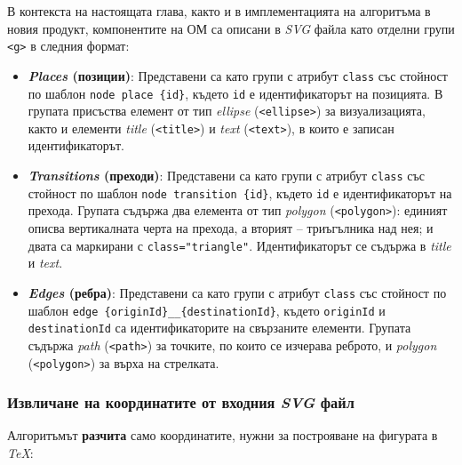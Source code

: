 В контекста на настоящата глава, както и в имплементацията на алгоритъма в новия продукт, компонентите на ОМ са описани в \textit{SVG} файла като отделни групи \texttt{<g>} в следния формат:

\begin{itemize}
	\item \textbf{\textit{Places} (позиции)}: Представени са като групи с атрибут \texttt{class} със стойност по шаблон \texttt{node place \{id\}}, където \texttt{id} е идентификаторът на позицията. В групата присъства елемент от тип \textit{ellipse} (\texttt{<ellipse>}) за визуализацията, както и елементи \textit{title} (\texttt{<title>}) и \textit{text} (\texttt{<text>}), в които е записан идентификаторът.
	
	\item \textbf{\textit{Transitions} (преходи)}: Представени са като групи с атрибут \texttt{class} със стойност по шаблон \texttt{node transition \{id\}}, където \texttt{id} е идентификаторът на прехода. Групата съдържа два елемента от тип \textit{polygon} (\texttt{<polygon>}): единият описва вертикалната черта на прехода, а вторият – триъгълника над нея; и двата са маркирани с \texttt{class="triangle"}. Идентификаторът се съдържа в \textit{title} и \textit{text}.
	
	\item \textbf{\textit{Edges} (ребра)}: Представени са като групи с атрибут \texttt{class} със стойност по шаблон \texttt{edge \{originId\}\_\_\{destinationId\}}, където \texttt{originId} и \texttt{destinationId} са идентификаторите на свързаните елементи. Групата съдържа \textit{path} (\texttt{<path>}) за точките, по които се изчерава реброто, и \textit{polygon} (\texttt{<polygon>}) за върха на стрелката.
\end{itemize}


\subsubsection{Извличане на координатите от входния \textit{SVG} файл}
\hspace*{2.5em}Алгоритъмът \textbf{разчита} само координатите, нужни за построяване на фигурата в \textit{TeX}:

